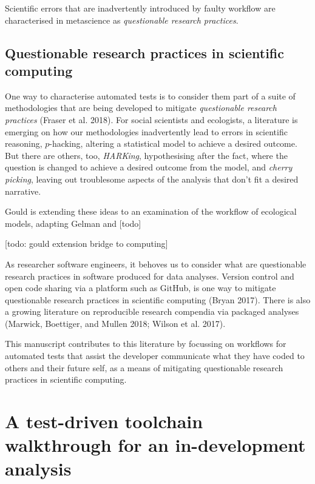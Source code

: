 \documentclass[
]{article}
\begin{document}
Scientific errors that are inadvertently introduced by faulty workflow
are characterised in metascience as \emph{questionable research
practices}.

\hypertarget{questionable-research-practices-in-scientific-computing}{%
\subsection{Questionable research practices in scientific
computing}\label{questionable-research-practices-in-scientific-computing}}

One way to characterise automated tests is to consider them part of a
suite of methodologies that are being developed to mitigate
\emph{questionable research practices} (Fraser et al. 2018). For social
scientists and ecologists, a literature is emerging on how our
methodologies inadvertently lead to errors in scientific reasoning,
\(p\)-hacking, altering a statistical model to achieve a desired
outcome. But there are others, too, \emph{HARKing}, hypothesising after
the fact, where the question is changed to achieve a desired outcome
from the model, and \emph{cherry picking}, leaving out troublesome
aspects of the analysis that don't fit a desired narrative.

Gould is extending these ideas to an examination of the workflow of
ecological models, adapting Gelman and {[}todo{]}

{[}todo: gould extension bridge to computing{]}

As researcher software engineers, it behoves us to consider what are
questionable research practices in software produced for data analyses.
Version control and open code sharing via a platform such as GitHub, is
one way to mitigate questionable research practices in scientific
computing (Bryan 2017). There is also a growing literature on
reproducible research compendia via packaged analyses (Marwick,
Boettiger, and Mullen 2018; Wilson et al. 2017).

This manuscript contributes to this literature by focussing on workflows
for automated tests that assist the developer communicate what they have
coded to others and their future self, as a means of mitigating
questionable research practices in scientific computing.

\hypertarget{a-test-driven-toolchain-walkthrough-for-an-in-development-analysis}{%
\section{A test-driven toolchain walkthrough for an in-development
analysis}\label{a-test-driven-toolchain-walkthrough-for-an-in-development-analysis}}
\end{document}

